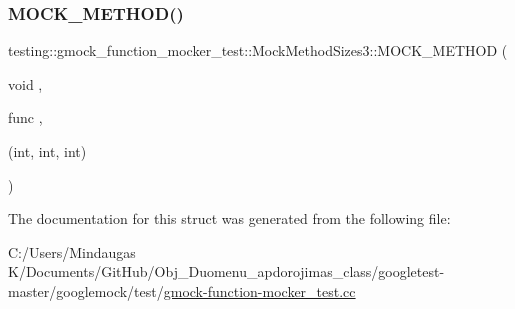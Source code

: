\mbox{\label{structtesting_1_1gmock__function__mocker__test_1_1_mock_method_sizes3_ad85fc73275d13ba9b6ced01e5ef832cc}} 
\subsubsection{\texorpdfstring{MOCK\_METHOD()}{MOCK\_METHOD()}\hspace{0.1cm}{\footnotesize\ttfamily [2/2]}}
{\footnotesize\ttfamily testing\+::gmock\+\_\+function\+\_\+mocker\+\_\+test\+::\+Mock\+Method\+Sizes3\+::\+M\+O\+C\+K\+\_\+\+M\+E\+T\+H\+OD (\begin{DoxyParamCaption}\item[{void}]{,  }\item[{func}]{,  }\item[{(int, int, int)}]{ }\end{DoxyParamCaption})}



The documentation for this struct was generated from the following file\+:\begin{DoxyCompactItemize}
\item 
C\+:/\+Users/\+Mindaugas K/\+Documents/\+Git\+Hub/\+Obj\+\_\+\+Duomenu\+\_\+apdorojimas\+\_\+class/googletest-\/master/googlemock/test/\mbox{\hyperlink{googletest-master_2googlemock_2test_2gmock-function-mocker__test_8cc}{gmock-\/function-\/mocker\+\_\+test.\+cc}}\end{DoxyCompactItemize}
